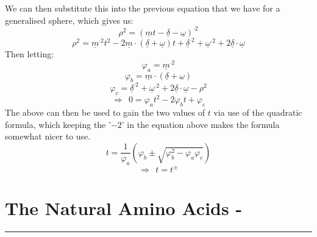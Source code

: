 \documentclass[a4paper,10pt]{article}
\begin{document}
We can then substitute this into the previous equation that we have for a generalised sphere, which gives us:
\begin{equation}
\rho^2 = (\underline{m} t - \underline{\delta} - \underline{\omega})^{\cdot 2}
\end{equation}
\begin{equation}
	\rho^2 = \underline{m}^{\cdot 2} t^2 - 2  \underline{m} \cdot (\underline{\delta} + \underline{\omega}) t + \underline{\delta}^{\cdot 2} + \underline{\omega}^{\cdot 2} + 2 \underline{\delta} \cdot \underline{\omega}
\end{equation}
Then letting:
\begin{equation}
\varphi_a = \underline{m}^{\cdot 2}
\end{equation}
\begin{equation}
\varphi_b = \underline{m} \cdot (\underline{\delta} + \underline{\omega})
\end{equation}
\begin{equation}
\varphi_c = \underline{\delta}^{\cdot 2} + \underline{\omega}^{\cdot 2} + 2 \underline{\delta} \cdot \underline{\omega} - \rho^2
\end{equation}
\begin{equation}
\Rightarrow \ \ 0 = \varphi_a t^2 - 2\varphi_b t + \varphi_c
\end{equation}
The above can then be used to gain the two values of $t$ via use of the quadratic formula, which keeping the '$-2$' in the equation above makes the formula somewhat nicer to use.
\begin{equation}
t = \frac{1}{\varphi_a} \left(\varphi_b \pm \sqrt{\varphi_b^2 - \varphi_a \varphi_c} \right)
\end{equation}
$$ \Rightarrow \ \ t = t^\pm $$

\section{The Natural Amino Acids -}
\rule{\textwidth}{1pt}
\end{document}
